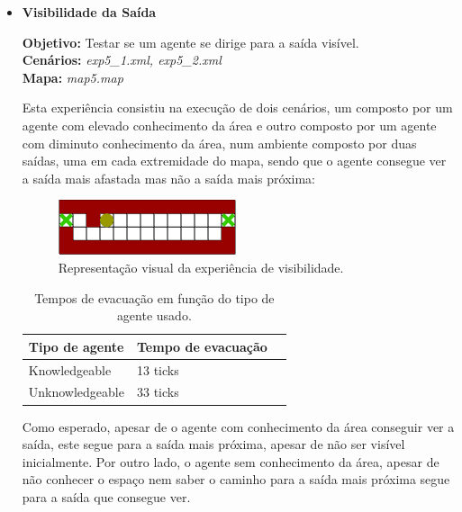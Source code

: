 \documentclass[12pt]{article}
\begin{document}
\begin{titlepage}
\begin{itemize}

	\item \textbf{Visibilidade da Saída}

	\textbf{Objetivo:} 
                                                                                                                                  	Testar se um agente se dirige para a saída visível.
\\\textbf{Cenários:} 
\textit{exp5\_1.xml, exp5\_2.xml}
\\\textbf{Mapa:} 
\textit{map5.map}

Esta experiência consistiu na execução de dois cenários, um composto por um agente com elevado conhecimento da área e outro composto por um agente com diminuto conhecimento da área, num ambiente composto por duas saídas, uma em cada extremidade do mapa, sendo que o agente consegue ver a saída mais afastada mas não a saída mais próxima:

\begin{figure}[H]
	\centering
	\includegraphics[scale=1]{map5.png}
	\caption{Representação visual da experiência de visibilidade.}
	\label{map}
\end{figure}


\setlength{\tabcolsep}{20pt}
\renewcommand{\arraystretch}{1.3}
\begin{table}[H]
	\centering
	\caption{Tempos de evacuação em função do tipo de agente usado.}
	\begin{tabular}{@{}lll@{}}
		\toprule
		\rowcolor[HTML]{FFFFFF} 
		\textbf{Tipo de agente}  & \textbf{Tempo de evacuação}\\
		\toprule
		\rowcolor[HTML]{FFFFFF} 
		Knowledgeable & 13 ticks \\ \midrule 
		\rowcolor[HTML]{FFFFFF} Unknowledgeable &
		33 ticks \\ \midrule 
	\end{tabular}
\end{table}

Como esperado, apesar de o agente com conhecimento da área conseguir ver a saída, este segue para a saída mais próxima, apesar de não ser visível inicialmente. Por outro lado, o agente sem conhecimento da área, apesar de não conhecer o espaço nem saber o caminho para a saída mais próxima segue para a saída que consegue ver.\newline


\end{itemize}
\end{titlepage}
\end{document}
